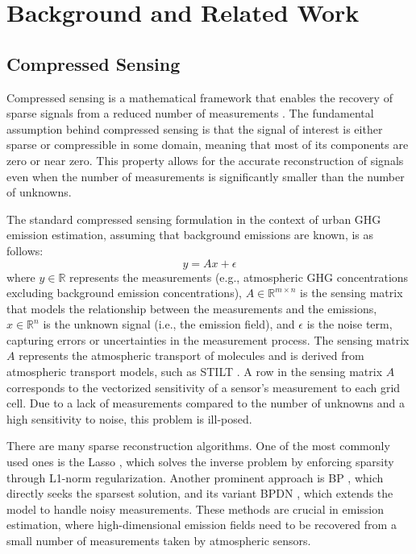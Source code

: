 
\chapter{Background and Related Work}\label{chapter:related_work}

\section{Compressed Sensing}
Compressed sensing is a mathematical framework that enables the recovery of sparse signals from a reduced number of measurements \parencite{CompressedSensingIntro}.
The fundamental assumption behind compressed sensing is that the signal of interest is either sparse or compressible in some domain, meaning that most of its components are zero or near zero.
This property allows for the accurate reconstruction of signals even when the number of measurements is significantly smaller than the number of unknowns.

The standard compressed sensing formulation in the context of urban \gls{GHG} emission estimation, assuming that background emissions are known, is as follows:
\begin{equation}
    y = A x + \epsilon
\end{equation}
where $y \in \mathbb{R}$ represents the measurements (e.g., atmospheric \gls{GHG} concentrations excluding background emission concentrations), $A \in \mathbb{R}^{m \times n}$ is the sensing matrix that models the relationship between the measurements and the emissions, $x \in \mathbb{R}^n$ is the unknown signal (i.e., the emission field), and $\epsilon$ is the noise term, capturing errors or uncertainties in the measurement process.
The sensing matrix $A$ represents the atmospheric transport of molecules and is derived from atmospheric transport models, such as STILT \parencite{STILT}.
A row in the sensing matrix $A$ corresponds to the vectorized sensitivity of a sensor's measurement to each grid cell.
Due to a lack of measurements compared to the number of unknowns and a high sensitivity to noise, this problem is ill-posed.

There are many sparse reconstruction algorithms.
One of the most commonly used ones is the \gls{Lasso} \parencite{Lasso}, which solves the inverse problem by enforcing sparsity through L1-norm regularization.
Another prominent approach is \gls{BP} \parencite{BPDN}, which directly seeks the sparsest solution, and its variant \gls{BPDN} \parencite{BPDN}, which extends the model to handle noisy measurements.
These methods are crucial in emission estimation, where high-dimensional emission fields need to be recovered from a small number of measurements taken by atmospheric sensors.

